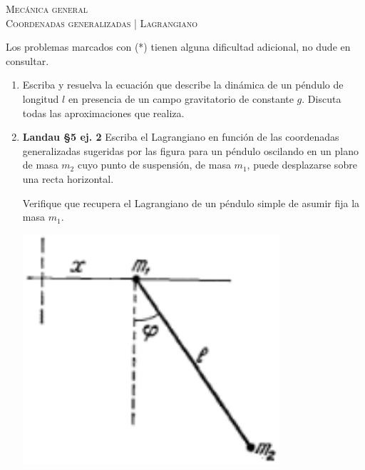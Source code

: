 \documentclass[11pt,spanish,a4paper]{article}
\begin{document}
\begin{center}
  \textsc{\large Mecánica general}\\
  \textsc{\large Coordenadas generalizadas | Lagrangiano}
\end{center}

\noindent
Los problemas marcados con (*) tienen alguna dificultad adicional, no dude en consultar.
\begin{enumerate}


\item Escriba y resuelva la ecuación que describe la dinámica de un péndulo de longitud $l$ en presencia de un campo gravitatorio de constante $g$. Discuta todas las aproximaciones que realiza.



\item \begin{minipage}[t][3.5cm]{0.7\textwidth}
\textbf{Landau \S5 ej. 2}
Escriba el Lagrangiano en función de las coordenadas generalizadas sugeridas por las figura para un péndulo oscilando en un plano de masa \(m_2\) cuyo punto de suspensión, de masa \(m_1\), puede desplazarse sobre una recta horizontal.

Verifique que recupera el Lagrangiano de un péndulo simple de asumir fija la masa \(m_1\).
\end{minipage}
	\begin{minipage}[c][1cm][t]{0.3\textwidth}
        \includegraphics[width=0.75\textwidth]{landauFig52_2.png}
\end{minipage}





\end{enumerate}
\end{document}
